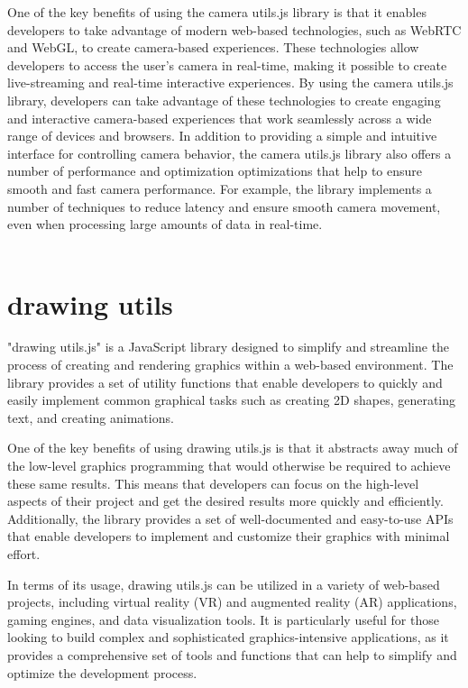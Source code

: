 One of the key benefits of using the camera utils.js library is that it enables developers to take advantage of 
modern web-based technologies, such as WebRTC and WebGL, to create camera-based experiences. These technologies 
allow developers to access the user's camera in real-time, making it possible to create live-streaming and 
real-time interactive experiences. By using the camera utils.js library, developers can take advantage of these 
technologies to create engaging and interactive camera-based experiences that work seamlessly across a wide range of devices and browsers.
In addition to providing a simple and intuitive interface for controlling camera behavior, the camera utils.js 
library also offers a number of performance and optimization optimizations that help to ensure smooth and fast 
camera performance. For example, the library implements a number of techniques to reduce latency and ensure 
smooth camera movement, even when processing large amounts of data in real-time.
\\
\\
\section{drawing utils}
"drawing utils.js" is a JavaScript library designed to simplify and streamline the process of 
creating and rendering graphics within a web-based environment. The library provides a set of utility 
functions that enable developers to quickly and easily implement common graphical tasks such as 
creating 2D shapes, generating text, and creating animations.

One of the key benefits of using drawing utils.js is that it abstracts away much of the 
low-level graphics programming that would otherwise be required to achieve these same results. 
This means that developers can focus on the high-level aspects of their project and get the 
desired results more quickly and efficiently. Additionally, the library provides a set of 
well-documented and easy-to-use APIs that enable developers to implement and customize 
their graphics with minimal effort.

In terms of its usage, drawing utils.js can be utilized in a variety of web-based projects, 
including virtual reality (VR) and augmented reality (AR) applications, gaming engines, 
and data visualization tools. It is particularly useful for those looking to build complex 
and sophisticated graphics-intensive applications, as it provides a comprehensive set of 
tools and functions that can help to simplify and optimize the development process.

